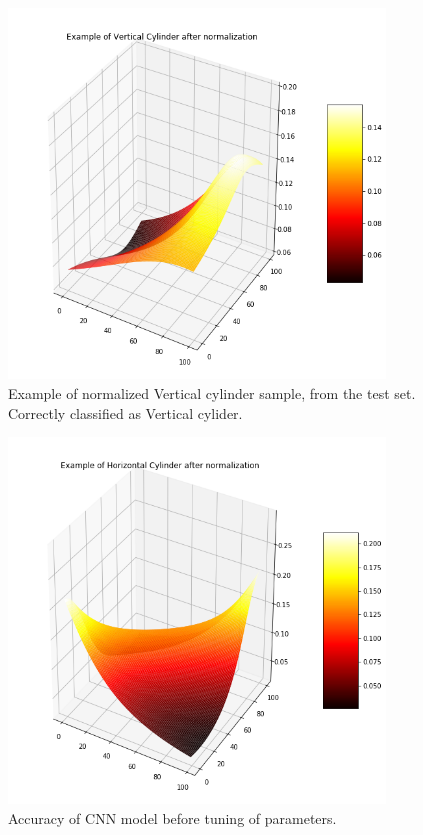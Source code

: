 \documentclass{article}
\begin{document}
\begin{figure}[!htp]
\centerline{\includegraphics[width=10cm]{img/vertical_normalized.png}}
\renewcommand{\figurename}{Figure}
\caption[Example of normalized Vertical cylinder.]{Example of normalized Vertical cylinder sample, from the test set. Correctly classified as Vertical cylider.}
\label{fig:NormalizedVertical}
\end{figure}

\begin{figure}[!htp]
\centerline{\includegraphics[width=10cm]{img/horizontal_normalized.png}}
\renewcommand{\figurename}{Figure}
\caption[Accuracy of CNN model before tuning of parameters.]{Accuracy of CNN model before tuning of parameters.}
\label{fig:NormalizedHorizontal}
\end{figure}
\end{document}
